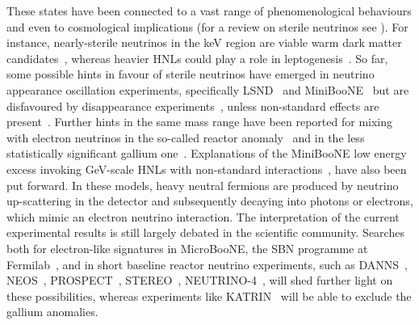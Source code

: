These states have been connected to a vast range of phenomenological behaviours and %
even to cosmological implications (for a review on sterile neutrinos see ).
For instance, nearly-sterile neutrinos in the keV region are viable warm dark matter candidates~\cite{Asaka:2005an}, %
whereas heavier HNLs could play a role in leptogenesis~\cite{Fukugita:1986hr, Covi:1996wh, Pilaftsis:1997jf}.
So far, some possible hints in favour of sterile neutrinos have emerged in neutrino appearance oscillation experiments, %
specifically LSND~\cite{Aguilar:2001ty} and MiniBooNE~\cite{Aguilar-Arevalo:2012fmn, Aguilar-Arevalo:2013pmq, Aguilar-Arevalo:2018gpe} %
but are disfavoured by disappearance experiments~\cite{TheIceCube:2016oqi, Adamson:2017uda, Aartsen:2017bap}, %
unless non-standard effects are present~\cite{Liao:2016reh, Liao:2018mbg, Esmaili:2018qzu, Denton:2018dqq}.
Further hints in the same mass range have been reported for mixing with electron neutrinos in the %
so-called reactor anomaly~\cite{Mueller:2011nm, Mention:2011rk, Huber:2011wv, Ko:2016owz, Alekseev:2018efk} %
and in the less statistically significant gallium one~\cite{Abdurashitov:2005tb, Laveder:2007zz, Giunti:2006bj}.
Explanations of the MiniBooNE low energy excess invoking GeV-scale HNLs with non-standard %
interactions~\cite{Gninenko:2009ks, Gninenko:2010pr, Masip:2012ke, Bertuzzo:2018itn, Ballett:2018ynz}, %
have also been put forward.
In these models, heavy neutral fermions are produced by neutrino up-scattering in the detector %
and subsequently decaying into photons or electrons, which mimic an electron neutrino interaction.
The interpretation of the current experimental results is still largely debated in the scientific community.
Searches both for electron-like signatures in MicroBooNE, the SBN programme at Fermilab~\cite{Antonello:2015lea}, %
and in short baseline reactor neutrino experiments, such as DANNS~\cite{Alekseev:2018efk}, NEOS~\cite{Ko:2016owz}, %
PROSPECT~\cite{Ashenfelter:2018iov}, STEREO~\cite{Almazan:2018wln}, \mbox{NEUTRINO-4}~\cite{Serebrov:2018vdw}, %
will shed further light on these possibilities, %
whereas experiments like KATRIN~\cite{Mertens:2018vuu} will be able to exclude the gallium anomalies.

